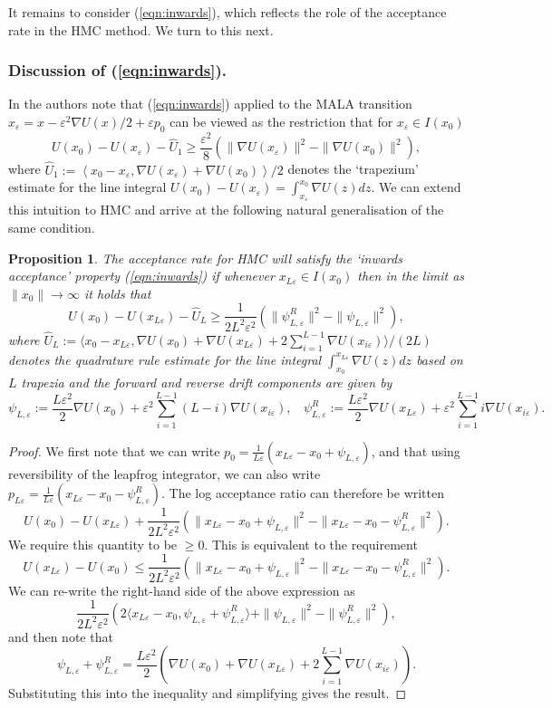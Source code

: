 \documentclass[bj,numbers,noshowframe]{imsart}
\newcommand{\e}{\varepsilon}
\theoremstyle{definition}
\theoremstyle{plain}
\newtheorem{prop}[defn]{Proposition}
\theoremstyle{definition}
\begin{document}
It remains to consider (\ref{eqn:inwards}), which reflects the role of the acceptance rate in the HMC method.  We turn to this next.

\subsubsection{Discussion of (\ref{eqn:inwards}).}

In \citep{roberts1996exponential} the authors note that (\ref{eqn:inwards}) applied to the MALA transition
$x_{\e}=x-\e^{2}\nabla U(x)/2+\e p_{0}$ can be
viewed as the restriction that for $x_{\e}\in I(x_{0})$
\[
U(x_0)-U(x_\e)-\hat{U}_{1}\geq\frac{\e^2}{8}\left(\|\nabla U(x_{\e})\|^{2}-\|\nabla U(x_{0})\|^{2}\right),
\]
where $\hat{U}_{1}:=\left\langle x_0 - x_\e,\nabla U(x_\e)+\nabla U(x_0)\right\rangle /2$
denotes the `trapezium' estimate for the line integral $U(x_0)-U(x_\e)=\int_{x_\e}^{x_0}\nabla U(z)dz$.
We can extend this intuition to HMC and arrive at the following natural
generalisation of the same condition.
\begin{prop}
The acceptance rate for HMC will satisfy the `inwards acceptance'
property (\ref{eqn:inwards}) if whenever $x_{L\e}\in I(x_{0})$ then in the limit as $\|x_0\|\to\infty$ it holds that
\begin{equation} \label{eqn:ic2}
U(x_0)-U(x_{L\e})-\hat{U}_{L}\geq\frac{1}{2L^{2}\e^{2}}\left(\|\psi_{L,\e}^{R}\|^{2}-\|\psi_{L,\e}\|^{2}\right),
\end{equation}
where $\hat{U}_L:=\langle x_{0}-x_{L\e},\nabla U(x_{0})+\nabla U(x_{L\e})+2\sum_{i=1}^{L-1}\nabla U(x_{i\e})\rangle/(2L)$
denotes the quadrature rule estimate for the line integral $\int_{x_0}^{x_{L\e}}\nabla U(z)dz$
based on $L$ trapezia and the forward and reverse drift components
are given by
\[
\psi_{L,\e}:=\frac{L\e^{2}}{2}\nabla U(x_{0})+\e^{2}\sum_{i=1}^{L-1}(L-i)\nabla U(x_{i\e}), ~~~~ 
\psi_{L,\e}^{R}:=\frac{L\e^{2}}{2}\nabla U(x_{L\e})+\e^{2}\sum_{i=1}^{L-1}i\nabla U(x_{i\e}).
\]
\end{prop}
\begin{proof}
We first note that we can write $p_{0}=\frac{1}{L\e}(x_{L\e}-x_{0}+\psi_{L,\e})$,
and that using reversibility of the leapfrog integrator, we can also
write $p_{L\e}=\frac{1}{L\e}(x_{L\e}-x_{0}-\psi_{L,\e}^{R})$.
The log acceptance ratio can therefore be written
\[
U(x_0)-U(x_{L\e})+\frac{1}{2L^{2}\e^{2}}\left(\|x_{L\e}-x_{0}+\psi_{L,\e}\|^{2}-\|x_{L\e}-x_{0}-\psi_{L,\e}^{R}\|^{2}\right).
\]
We require this quantity to be $\geq0$. This is equivalent to the
requirement
\[
U(x_{L\e})-U(x_0) \leq\frac{1}{2L^{2}\e^{2}}\left(\|x_{L\e}-x_{0}+\psi_{L,\e}\|^{2}-\|x_{L\e}-x_{0}-\psi_{L,\e}^{R}\|^{2}\right).
\]
We can re-write the right-hand side of the above expression as
\[
\frac{1}{2L^{2}\e^{2}}\left(2\langle x_{L\e}-x_{0},\psi_{L,\e}+\psi_{L,\e}^{R}\rangle+\|\psi_{L,\e}\|^{2}-\|\psi_{L,\e}^{R}\|^{2}\right),
\]
and then note that
\[
\psi_{L,\e}+\psi_{L,\e}^{R}=\frac{L\e^{2}}{2}\left(\nabla U(x_{0})+\nabla U(x_{L\e})+2\sum_{i=1}^{L-1}\nabla U(x_{i\e})\right).
\]
Substituting this into the inequality and simplifying gives the result. 
\end{proof}
\end{document}
